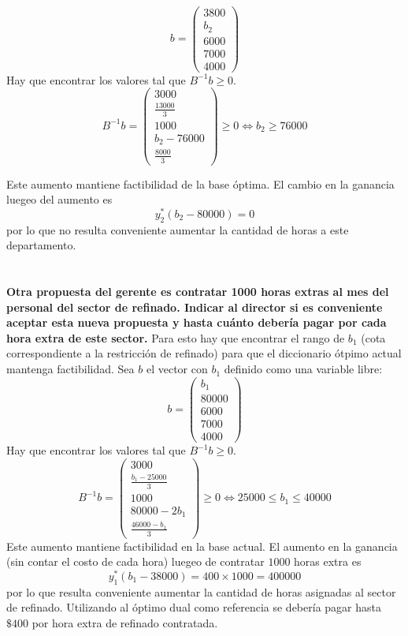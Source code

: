 \documentclass[10pt,a4paper]{article}
\begin{document}
$$
b = \begin{pmatrix}
	3800 \\
	b_2 \\
	6000 \\
	7000 \\
	4000
\end{pmatrix}
$$
Hay que encontrar los valores tal que $B^{-1}b \geq 0$.
$$
B^{-1}b = \begin{pmatrix}
	3000 \\
	\frac{13000}{3} \\
	1000 \\
	b_2 - 76000 \\
	\frac{8000}{3}
\end{pmatrix}  \geq 0 \iff b_2 \geq 76000
$$

Este aumento mantiene factibilidad de la base óptima. El cambio en la ganancia luegeo del aumento es
$$y^*_2(b_2 - 80000) = 0$$ por lo que no resulta conveniente aumentar la cantidad de horas a este departamento.

\section{} %
\textbf{Otra propuesta del gerente es contratar 1000 horas extras al mes del personal del sector de refinado. Indicar al director si es conveniente aceptar esta nueva propuesta y hasta cuánto debería pagar por cada hora extra de este sector.}
Para esto hay que encontrar el rango de $b_1$ (cota correspondiente a la restricción de refinado) para que el diccionario ótpimo actual mantenga factibilidad. Sea $b$ el vector con $b_1$ definido como una variable libre:
$$
b = \begin{pmatrix}
	b_1 \\
	80000 \\
	6000 \\
	7000 \\
	4000
\end{pmatrix}
$$
Hay que encontrar los valores tal que $B^{-1}b \geq 0$.
$$
B^{-1}b =
\begin{pmatrix}
	3000 \\
	\frac{b_1 - 25000}{3} \\
	1000 \\
	80000 - 2b_1 \\
	\frac{46000 - b_1}{3}
\end{pmatrix} \geq 0 \iff 25000 \leq b_1 \leq 40000
$$
Este aumento mantiene factibilidad en la base actual. El aumento en la ganancia (sin contar el costo de cada hora) luegeo de contratar $1000$ horas extra es $$y^*_1(b_1 - 38000) = 400 \times 1000 = 400000$$
por lo que resulta conveniente aumentar la cantidad de horas asignadas al sector de refinado. Utilizando al óptimo dual como referencia se debería pagar hasta $\$400$ por hora extra de refinado contratada.
\end{document}
